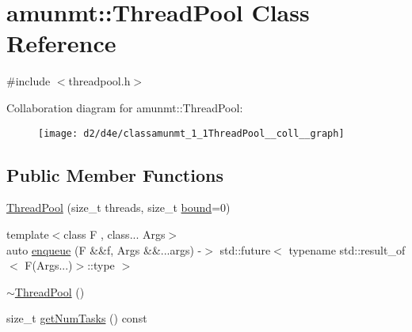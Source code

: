 \hypertarget{classamunmt_1_1ThreadPool}{}\section{amunmt\+:\+:Thread\+Pool Class Reference}
\label{classamunmt_1_1ThreadPool}


{\ttfamily \#include $<$threadpool.\+h$>$}



Collaboration diagram for amunmt\+:\+:Thread\+Pool\+:
\nopagebreak
\begin{figure}[H]
\begin{center}
\leavevmode
\texttt{[image: d2/d4e/classamunmt\_1\_1ThreadPool\_\_coll\_\_graph]}
\end{center}
\end{figure}
\subsection*{Public Member Functions}
\begin{DoxyCompactItemize}
\item 
\hyperlink{classamunmt_1_1ThreadPool_a3bc1ace57ef28ce5c78ee1672ae9c382}{Thread\+Pool} (size\+\_\+t threads, size\+\_\+t \hyperlink{classamunmt_1_1ThreadPool_aa85a12e692be6c514ffd8443b80ba0dc}{bound}=0)
\item 
{\footnotesize template$<$class F , class... Args$>$ }\\auto \hyperlink{classamunmt_1_1ThreadPool_a1bb89599cb11af51958c771c437aff22}{enqueue} (F \&\&f, Args \&\&...args) -\/$>$ std\+::future$<$ typename std\+::result\+\_\+of$<$ F(Args...)$>$\+::type $>$
\item 
\hyperlink{classamunmt_1_1ThreadPool_a03f83dd78a39dbe485326a50497d6906}{$\sim$\+Thread\+Pool} ()
\item 
size\+\_\+t \hyperlink{classamunmt_1_1ThreadPool_a56f770af85865ea1eb35f3d2ade28043}{get\+Num\+Tasks} () const 
\end{DoxyCompactItemize}
